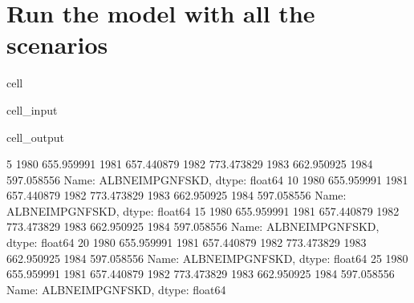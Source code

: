 \documentclass[letterpaper,10pt,english]{jupyterBook}
\begin{document}
\section{Run the model with all the scenarios}
\label{\detokenize{content/howto/experiments/create_save_scenarios:run-the-model-with-all-the-scenarios}}
\begin{sphinxuseclass}{cell}\begin{sphinxVerbatimInput}

\begin{sphinxuseclass}{cell_input}
\begin{sphinxVerbatim}[commandchars=\\\{\}]
    
\end{sphinxVerbatim}

\end{sphinxuseclass}\end{sphinxVerbatimInput}
\begin{sphinxVerbatimOutput}

\begin{sphinxuseclass}{cell_output}
\begin{sphinxVerbatim}[commandchars=\\\{\}]
5 1980    655.959991
1981    657.440879
1982    773.473829
1983    662.950925
1984    597.058556
Name: ALBNEIMPGNFSKD, dtype: float64
10 1980    655.959991
1981    657.440879
1982    773.473829
1983    662.950925
1984    597.058556
Name: ALBNEIMPGNFSKD, dtype: float64
15 1980    655.959991
1981    657.440879
1982    773.473829
1983    662.950925
1984    597.058556
Name: ALBNEIMPGNFSKD, dtype: float64
20 1980    655.959991
1981    657.440879
1982    773.473829
1983    662.950925
1984    597.058556
Name: ALBNEIMPGNFSKD, dtype: float64
25 1980    655.959991
1981    657.440879
1982    773.473829
1983    662.950925
1984    597.058556
Name: ALBNEIMPGNFSKD, dtype: float64
\end{sphinxVerbatim}

\end{sphinxuseclass}\end{sphinxVerbatimOutput}

\end{sphinxuseclass}
\end{document}
